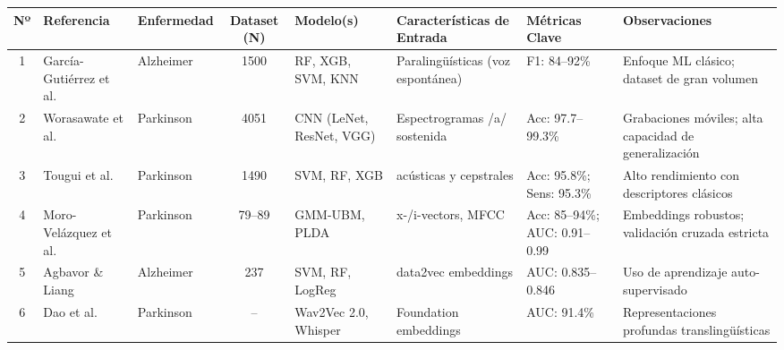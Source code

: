 \begin{landscape}
    \begin{table}[ht]
        \centering
        \footnotesize %
        \renewcommand{\arraystretch}{1.3} %
        \begin{tabularx}{\linewidth}{
            c 
            >{\raggedright\arraybackslash}p{3.5cm} 
            l 
            c 
            >{\raggedright\arraybackslash}X 
            >{\raggedright\arraybackslash}X 
            >{\raggedright\arraybackslash}p{2.6cm} 
            >{\raggedright\arraybackslash}X
        }
            \toprule
            \textbf{Nº} & \textbf{Referencia} & \textbf{Enfermedad} & \textbf{Dataset (N)} & \textbf{Modelo(s)} & \textbf{Características de Entrada} & \textbf{Métricas Clave} & \textbf{Observaciones} \\
            \midrule
            1  & García-Gutiérrez et al. \cite{garcia-gutierrezUnveilingSoundCognitive2024}    & Alzheimer  & 1500    & RF, XGB, SVM, KNN                & Paralingüísticas (voz espontánea) & F1: 84--92\%                  & Enfoque ML clásico; dataset de gran volumen      \\
            2  & Worasawate et al. \cite{worasawate2021}          & Parkinson  & 4051    & CNN (LeNet, ResNet, VGG)         & Espectrogramas /a/ sostenida      & Acc: 97.7--99.3\%             & Grabaciones móviles; alta capacidad de generalización    \\
            3  & Tougui et al. \cite{tougui2020}              & Parkinson  & 1490    & SVM, RF, XGB                     & 138 acústicas y cepstrales        & Acc: 95.8\%; Sens: 95.3\%     & Alto rendimiento con descriptores clásicos  \\
            4  & Moro-Velázquez et al. \cite{moro2020, moro2021new} & Parkinson  & 79--89  & GMM-UBM, PLDA                    & x-/i-vectors, MFCC                & Acc: 85--94\%; AUC: 0.91--0.99 & Embeddings robustos; validación cruzada estricta \\
            5  & Agbavor \& Liang \cite{agbavor2022}           & Alzheimer  & 237     & SVM, RF, LogReg                  & data2vec embeddings               & AUC: 0.835--0.846            & Uso de aprendizaje auto-supervisado                \\
            6  & Dao et al. \cite{dao2025}                 & Parkinson  & --      & Wav2Vec 2.0, Whisper             & Foundation embeddings             & AUC: 91.4\%                  & Representaciones profundas translingüísticas              \\

\end{tabularx}
\end{table}
\end{landscape}
